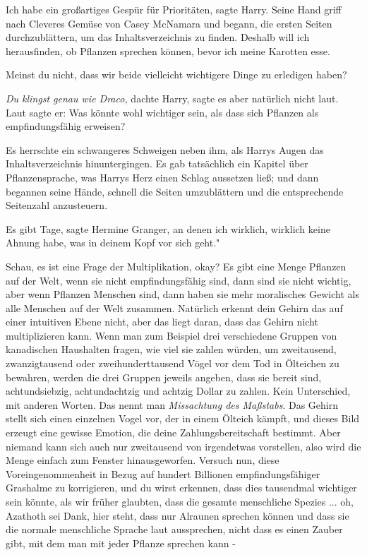 \glqq Ich habe ein großartiges Gespür für Prioritäten\grqq{}, sagte Harry. Seine
Hand griff nach \glqq Cleveres Gemüse\grqq{} von Casey McNamara und begann, die
ersten Seiten durchzublättern, um das Inhaltsverzeichnis zu finden. \glqq
Deshalb will ich herausfinden, ob Pflanzen sprechen können, bevor ich meine
Karotten esse.\grqq{}

\glqq Meinst du nicht, dass wir beide vielleicht wichtigere Dinge zu erledigen
haben?\grqq{}

\emph{Du klingst genau wie Draco,} dachte Harry, sagte es aber natürlich nicht
laut. Laut sagte er: \glqq Was könnte wohl wichtiger sein, als dass sich
Pflanzen als empfindungsfähig erweisen?\grqq{}

Es herrschte ein schwangeres Schweigen neben ihm, als Harrys Augen das
Inhaltsverzeichnis hinuntergingen. Es gab tatsächlich ein Kapitel über
Pflanzensprache, was Harrys Herz einen Schlag aussetzen ließ; und dann begannen
seine Hände, schnell die Seiten umzublättern und die entsprechende Seitenzahl
anzusteuern.

\glqq Es gibt Tage\grqq{}, sagte Hermine Granger, \glqq an denen ich wirklich,
wirklich keine Ahnung habe, was in deinem Kopf vor sich geht."

\glqq Schau, es ist eine Frage der Multiplikation, okay? Es gibt eine Menge
Pflanzen auf der Welt, wenn sie nicht empfindungsfähig sind, dann sind sie nicht
wichtig, aber wenn Pflanzen Menschen sind, dann haben sie mehr moralisches
Gewicht als alle Menschen auf der Welt zusammen. Natürlich erkennt dein Gehirn
das auf einer intuitiven Ebene nicht, aber das liegt daran, dass das Gehirn
nicht multiplizieren kann. Wenn man zum Beispiel drei verschiedene Gruppen von
kanadischen Haushalten fragen, wie viel sie zahlen würden, um zweitausend,
zwanzigtausend oder zweihunderttausend Vögel vor dem Tod in Ölteichen zu
bewahren, werden die drei Gruppen jeweils angeben, dass sie bereit sind,
achtundsiebzig, achtundachtzig und achtzig Dollar zu zahlen. Kein Unterschied,
mit anderen Worten. Das nennt man \glqq \emph{Missachtung des Maßstabs}\grqq{}.
Das Gehirn stellt sich einen einzelnen Vogel vor, der in einem Ölteich kämpft,
und dieses Bild erzeugt eine gewisse Emotion, die deine Zahlungsbereitschaft
bestimmt. Aber niemand kann sich auch nur zweitausend von irgendetwas
vorstellen, also wird die Menge einfach zum Fenster hinausgeworfen. Versuch nun,
diese Voreingenommenheit in Bezug auf hundert Billionen empfindungsfähiger
Grashalme zu korrigieren, und du wirst erkennen, dass dies tausendmal wichtiger
sein könnte, als wir früher glaubten, dass die gesamte menschliche Spezies ...
oh, Azathoth sei Dank, hier steht, dass nur Alraunen sprechen können und dass
sie die normale menschliche Sprache laut aussprechen, nicht dass es einen Zauber
gibt, mit dem man mit jeder Pflanze sprechen kann -\grqq{}

